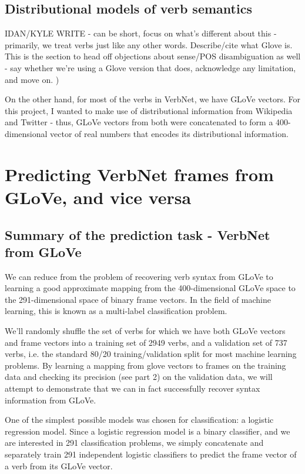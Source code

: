 \documentclass[a4paper]{article}
\begin{document}
\subsection{Distributional models of verb semantics}

IDAN/KYLE WRITE - can be short, focus on what's different about this - primarily, we treat verbs just like any other words. Describe/cite what Glove is. This is the section to head off objections about sense/POS disambiguation as well - say whether we're using a Glove version that does, acknowledge any limitation, and move on. )

On the other hand, for most of the verbs in VerbNet, we have GLoVe vectors. For this project, I wanted to make use of distributional information from Wikipedia and Twitter - thus, GLoVe vectors from both were concatenated to form a 400-dimensional vector of real numbers that encodes its distributional information. 

\section{Predicting VerbNet frames from GLoVe, and vice versa}

\subsection{Summary of the prediction task - VerbNet from GLoVe}

We can reduce from the problem of recovering verb syntax from GLoVe to learning a good approximate mapping from the 400-dimensional GLoVe space to the 291-dimensional space of binary frame vectors. In the field of machine learning, this is known as a multi-label classification problem.

We’ll randomly shuffle the set of verbs for which we have both GLoVe vectors and frame vectors into a training set of 2949 verbs, and a validation set of 737 verbs, i.e. the standard 80/20 training/validation split for most machine learning problems. By learning a mapping from glove vectors to frames on the training data and checking its precision (see part 2) on the validation data, we will attempt to demonstrate that we can in fact successfully recover syntax information from GLoVe.

One of the simplest possible models was chosen for classification: a logistic regression model. Since a logistic regression model is a binary classifier, and we are interested in 291 classification problems, we simply concatenate and separately train 291 independent logistic classifiers to predict the frame vector of a verb from its GLoVe vector.
\end{document}

